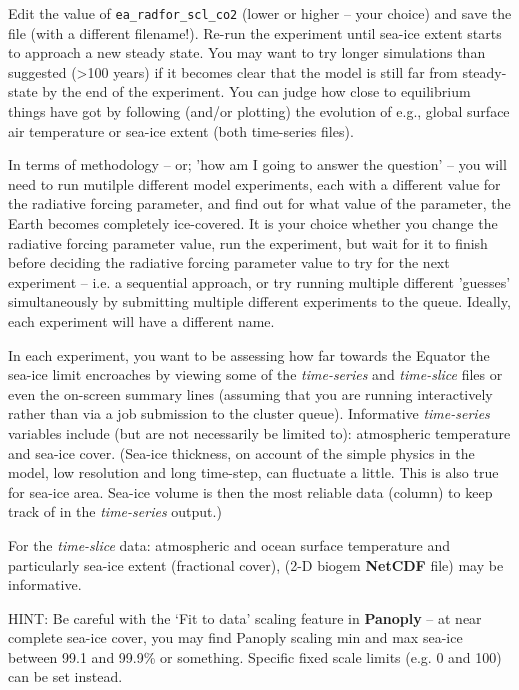 \documentclass[11pt,fleqn]{book} %
\begin{document}
Edit the value of \texttt{ea\_radfor\_scl\_co2} (lower or higher -- your choice) and save the file (with a different filename!). Re-run the experiment until sea-ice extent starts to approach a new steady state. You may want to try  longer simulations than suggested (\textgreater 100 years) if it becomes clear that the model is still far from steady-state by the end of the experiment. You can judge how close to equilibrium things have got by following (and/or plotting) the evolution of e.g., global surface air temperature or sea-ice extent (both time-series files).


\noindent 
In terms of methodology -- or; 'how am I going to answer the question' -- you will need to run mutilple different model experiments, each with a different value for the radiative forcing parameter, and find out for what value of the parameter, the Earth becomes completely ice-covered. It is your choice whether you change the radiative forcing parameter value, run the experiment, but wait for it to finish before deciding the radiative forcing parameter value to try for the next experiment -- i.e. a sequential approach, or try running multiple different 'guesses' simultaneously by submitting multiple different experiments to the queue. Ideally, each experiment will have a different name.

In each experiment, you want to be assessing how far towards the Equator the sea-ice limit encroaches by viewing some of the \textit{time-series} and \textit{time-slice} files or even the on-screen summary lines (assuming that you are running interactively rather than via a job submission to the cluster queue). Informative \textit{time-series} variables include (but are not necessarily be limited to): atmospheric temperature and sea-ice cover. (Sea-ice thickness, on account of the simple physics in the model, low resolution and long time-step, can fluctuate a little. This is also true for sea-ice area. Sea-ice volume is then the most reliable data (column) to keep track of in the \textit{time-series} output.)

For the \textit{time-slice} data: atmospheric and ocean surface temperature and particularly sea-ice extent (fractional cover), (2-D biogem \textbf{NetCDF} file) may be informative.

HINT: Be careful with the ‘\textsf{\footnotesize Fit to data}’ scaling feature in \textbf{Panoply} – at near complete sea-ice cover, you may find Panoply scaling min and max sea-ice between 99.1 and 99.9\% or something. Specific fixed scale limits (e.g. 0 and 100) can be set instead.
\end{document}
